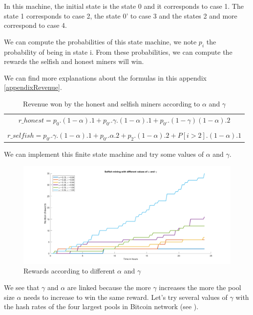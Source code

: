 In this machine, the initial state is the state 0 and it corresponds to case 1. The state 1 corresponds to case 2, the state 0' to case 3 and the states 2 and more correspond to case 4. \newline

We can compute the probabilities of this state machine, we note $p_i$ the probability of being in state i. From these probabilities, we can compute the rewards the selfish and honest miners will win. \newline

We can find more explanations about the formulas in this appendix \ref{appendixRevenue}. \newline

\begin{table}[ht]
  \centering

  \begin{tabular}{c}
    $r\_honest =  p_0 . (1 - \alpha) . 1 + p_{0'} . \gamma . (1 - \alpha) . 1 + p_{0'} . (1 - \gamma) (1 - \alpha) . 2$ \\
    \\
    $r\_selfish =  p_{0'} . \gamma . (1 - \alpha) . 1 + p_{0'} . \alpha . 2 + p_2 . (1 - \alpha) . 2 + P[i > 2] . (1 - \alpha) . 1$
  \end{tabular}
  \caption{Revenue won by the honest and selfish miners according to $\alpha$ and $\gamma$}
  \label{revenueFormulas}
\end{table}
\medskip

We can implement this finite state machine and try some values of $\alpha$ and $\gamma$.

\begin{figure}[ht]
\centering
\includegraphics[width=12cm]{Figures/selfishGraph}
\caption{Rewards according to different $\alpha$ and $\gamma$}
\end{figure}
\medskip

We see that $\gamma$ and $\alpha$ are linked because the more $\gamma$ increases the more the pool size $\alpha$ needs to increase to win the same reward. Let's try several values of $\gamma$ with the hash rates of the four largest pools in Bitcoin network (see \cite{hashrate_pools}).

